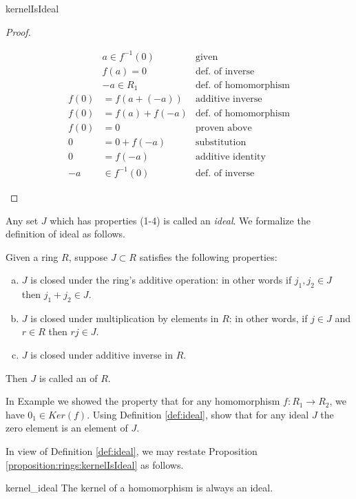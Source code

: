 \begin{prop}{kernelIsIdeal}
\begin{proof}
\begin{enumerate}
\begin{align*}
&a\in f^{-1}(0) & \text{given}\\
&f(a)=0 & \text{def. of inverse}\\
&-a\in R_1 & \text{def. of homomorphism}\\
f(0)&=f(a+(-a)) & \text{additive inverse}\\
f(0)&=f(a)+f(-a) & \text{def. of homomorphism}\\
f(0)&=0 & \text{proven above}\\
0&=0+f(-a) & \text{substitution}\\
0&=f(-a) & \text{additive identity}\\
-a&\in f^{-1}(0) & \text{def. of inverse}
\end{align*}
\end{enumerate}
\end{proof}
\end{prop}

Any set $J$ which has properties (1-4) is called an \textit{ideal}.  We formalize the definition of ideal as follows.

\begin{defn}\label{def:ideal}
Given a ring $R$, suppose $J \subset R$ satisfies the following properties:
\begin{enumerate}[(a)]
\item $J$ is closed under the ring's additive operation:  in other words if $j_1,j_2\in J$ then $j_1+j_2\in J$.
\item $J$ is closed under multiplication by elements in $R$:  in other words, if $j\in J$ and $r\in R$ then $rj\in J$.
\item $J$ is closed under additive inverse in $R$.
\end{enumerate}
Then $J$ is called an  of $R$.
\end{defn}

\begin{exercise}{}
In Example we showed the property that for any homomorphism $f:R_1\rightarrow R_2$, we have $0_1\in Ker(f)$.  Using Definition \ref{def:ideal}, show that for any ideal $J$ the zero element is an element of $J$. 
\end{exercise}

In view of Definition \ref{def:ideal}, we may restate Proposition \ref{proposition:rings:kernelIsIdeal} as follows.

\begin{prop}{kernel_ideal}
The kernel of a homomorphism is always an ideal.
\end{prop}

